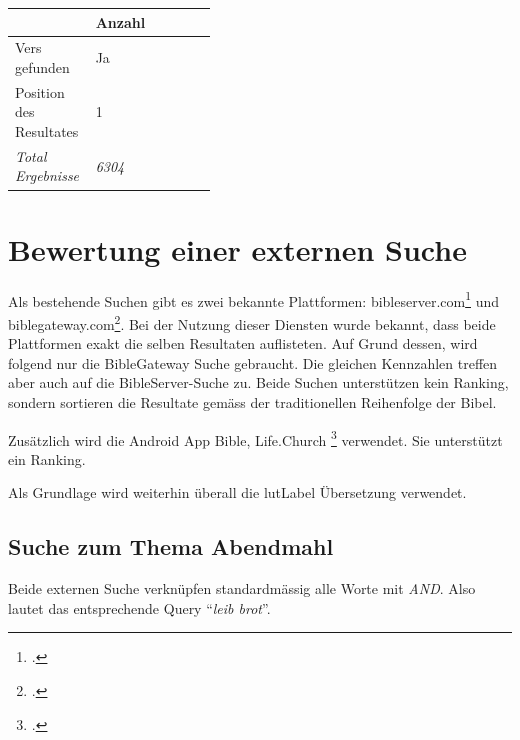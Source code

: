 \begin{table}[H]
	\centering
	\small\renewcommand{\arraystretch}{1.4}
	\label{tab:index_abendmahl}
	\begin{tabularx}{0.6\textwidth}{ L{0.4\linewidth} | X }%
		\hline
		& Anzahl\\ \hline \hline
		Vers gefunden & Ja\\
		Position des Resultates & 1\\
		\textit{Total Ergebnisse} & \textit{6304}\\
		\hline
	\end{tabularx}
\end{table}



\newpage
\section{Bewertung einer externen Suche}
Als bestehende Suchen gibt es zwei bekannte Plattformen: bibleserver.com\footcite{BibleServer_Die_Bibel_fr_alle_2016-05-30} und biblegateway.com\footcite{BibleGateway_2016-05-30}.
Bei der Nutzung dieser Diensten wurde bekannt, dass beide Plattformen exakt die selben Resultaten auflisteten. Auf Grund dessen, wird folgend nur die BibleGateway Suche gebraucht. Die gleichen Kennzahlen treffen aber auch auf die BibleServer-Suche zu. Beide Suchen unterstützen kein Ranking, sondern sortieren die Resultate gemäss der traditionellen Reihenfolge der Bibel.

Zusätzlich wird die Android App Bible, Life.Church \footcite{Bible_Android_Apps_on_Google_Play_2016-05-30} verwendet. Sie unterstützt ein Ranking.

Als Grundlage wird weiterhin überall die \gls{lutLabel} Übersetzung verwendet.



\subsection{Suche zum Thema Abendmahl}
Beide externen Suche verknüpfen standardmässig alle Worte mit \textit{AND}. Also lautet das entsprechende Query "`\textit{leib brot}"'.

